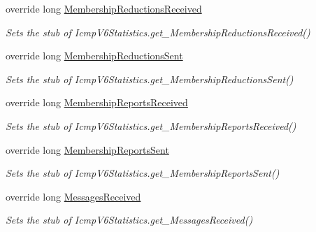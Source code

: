 \begin{DoxyCompactItemize}
override long \hyperlink{class_system_1_1_net_1_1_network_information_1_1_fakes_1_1_stub_icmp_v6_statistics_a347c9fef2935d49e0d458447641e10f3}{Membership\-Reductions\-Received}
\begin{DoxyCompactList}\small\item\em Sets the stub of Icmp\-V6\-Statistics.\-get\-\_\-\-Membership\-Reductions\-Received()\end{DoxyCompactList}\item 
override long \hyperlink{class_system_1_1_net_1_1_network_information_1_1_fakes_1_1_stub_icmp_v6_statistics_a9526dec1c81e2ac315c05134fceca700}{Membership\-Reductions\-Sent}
\begin{DoxyCompactList}\small\item\em Sets the stub of Icmp\-V6\-Statistics.\-get\-\_\-\-Membership\-Reductions\-Sent()\end{DoxyCompactList}\item 
override long \hyperlink{class_system_1_1_net_1_1_network_information_1_1_fakes_1_1_stub_icmp_v6_statistics_a378f9e8279ecd0d96290495e125ace9c}{Membership\-Reports\-Received}
\begin{DoxyCompactList}\small\item\em Sets the stub of Icmp\-V6\-Statistics.\-get\-\_\-\-Membership\-Reports\-Received()\end{DoxyCompactList}\item 
override long \hyperlink{class_system_1_1_net_1_1_network_information_1_1_fakes_1_1_stub_icmp_v6_statistics_a70b413ea4346bd545a948b839c5d7ded}{Membership\-Reports\-Sent}
\begin{DoxyCompactList}\small\item\em Sets the stub of Icmp\-V6\-Statistics.\-get\-\_\-\-Membership\-Reports\-Sent()\end{DoxyCompactList}\item 
override long \hyperlink{class_system_1_1_net_1_1_network_information_1_1_fakes_1_1_stub_icmp_v6_statistics_a1eb7ad54f28de48d91e213bba6b280b3}{Messages\-Received}
\begin{DoxyCompactList}\small\item\em Sets the stub of Icmp\-V6\-Statistics.\-get\-\_\-\-Messages\-Received()\end{DoxyCompactList}\item 

\end{DoxyCompactItemize}
